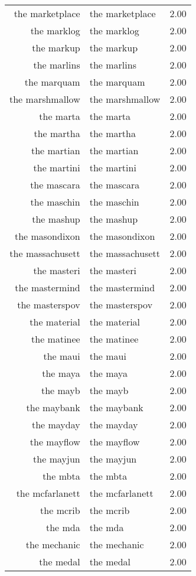 \begin{table}[ht]
\begin{tabular}{rlr}
  the marketplace & the marketplace & 2.00 \\ 
  the marklog & the marklog & 2.00 \\ 
  the markup & the markup & 2.00 \\ 
  the marlins & the marlins & 2.00 \\ 
  the marquam & the marquam & 2.00 \\ 
  the marshmallow & the marshmallow & 2.00 \\ 
  the marta & the marta & 2.00 \\ 
  the martha & the martha & 2.00 \\ 
  the martian & the martian & 2.00 \\ 
  the martini & the martini & 2.00 \\ 
  the mascara & the mascara & 2.00 \\ 
  the maschin & the maschin & 2.00 \\ 
  the mashup & the mashup & 2.00 \\ 
  the masondixon & the masondixon & 2.00 \\ 
  the massachusett & the massachusett & 2.00 \\ 
  the masteri & the masteri & 2.00 \\ 
  the mastermind & the mastermind & 2.00 \\ 
  the masterspov & the masterspov & 2.00 \\ 
  the material & the material & 2.00 \\ 
  the matinee & the matinee & 2.00 \\ 
  the maui & the maui & 2.00 \\ 
  the maya & the maya & 2.00 \\ 
  the mayb & the mayb & 2.00 \\ 
  the maybank & the maybank & 2.00 \\ 
  the mayday & the mayday & 2.00 \\ 
  the mayflow & the mayflow & 2.00 \\ 
  the mayjun & the mayjun & 2.00 \\ 
  the mbta & the mbta & 2.00 \\ 
  the mcfarlanett & the mcfarlanett & 2.00 \\ 
  the mcrib & the mcrib & 2.00 \\ 
  the mda & the mda & 2.00 \\ 
  the mechanic & the mechanic & 2.00 \\ 
  the medal & the medal & 2.00 \\ 

\end{tabular}
\end{table}
